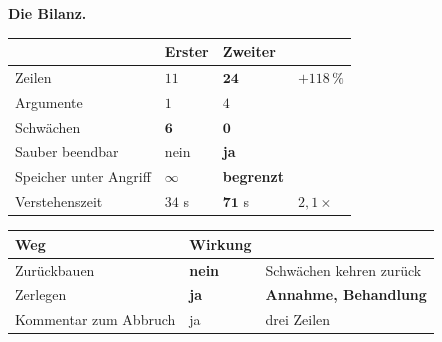 \begin{merksatz}
\textbf{Die Bilanz.}

\begin{center}
{\small
\renewcommand{\arraystretch}{1.45}
\begin{tabular}{@{}P{3.0cm}P{1.8cm}P{2.0cm}P{1.8cm}@{}}
\toprule
& \textbf{Erster} & \textbf{Zweiter} & \\
\midrule
Zeilen & $11$ & $\mathbf{24}$ & $+118\,\%$\\
Argumente & $1$ & $4$ & \\
Schwächen & $\mathbf{6}$ & $\mathbf{0}$ & \\
Sauber beendbar & \textcolor{akzent}{nein} & \textcolor{gruen}{\textbf{ja}} & \\
Speicher unter Angriff & \textcolor{akzent}{$\infty$} & \textcolor{gruen}{\textbf{begrenzt}} & \\
Verstehenszeit & $34$ s & $\mathbf{71}$ s & \textcolor{akzent}{$2{,}1\times$}\\
\bottomrule
\end{tabular}}
\end{center}

\begin{center}
\end{center}

\begin{technik}
\begin{center}
\renewcommand{\arraystretch}{1.5}
\begin{tabular}{@{}P{2.8cm}P{2.4cm}P{2.8cm}@{}}
\toprule
\textbf{Weg} & \textbf{Wirkung} & \\
\midrule
Zurückbauen & \textcolor{akzent}{\textbf{nein}} & \textcolor{akzent}{Schwächen kehren zurück}\\
Zerlegen & \textcolor{gruen}{\textbf{ja}} & \textbf{Annahme, Behandlung}\\
Kommentar zum Abbruch & \textcolor{gruen}{ja} & \textcolor{gruen}{drei Zeilen}\\
\bottomrule
\end{tabular}
\end{center}

\begin{center}
\begin{minipage}{0.86\textwidth}
\end{minipage}
\end{center}
\end{technik}
\end{merksatz}

